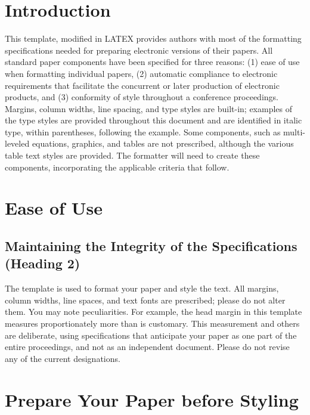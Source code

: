 \documentclass{article} %
\begin{document}
\begin{multicols}{2}



\section{ Introduction}


This template, modified in LATEX provides authors with most of the formatting specifications needed for preparing electronic versions of their papers. All standard paper components have been specified for three reasons: (1) ease of use when formatting individual papers, (2) automatic compliance to electronic requirements that facilitate the concurrent or later production of electronic products, and (3) conformity of style throughout a conference proceedings. Margins, column widths, line spacing, and type styles are built-in; examples of the type styles are provided throughout this document and are identified in italic type, within parentheses, following the example. Some components, such as multi-leveled equations, graphics, and tables are not prescribed, although the various table text styles are provided. The formatter will need to create these components, incorporating the applicable criteria that follow.


\section{ Ease of Use}


\subsection{Maintaining the Integrity of the Specifications (Heading 2)}



The template is used to format your paper and style the text. All margins, column widths, line spaces, and text fonts are prescribed; please do not alter them. You may note peculiarities. For example, the head margin in this template measures proportionately more than is customary. This measurement and others are deliberate, using specifications that anticipate your paper as one part of the entire proceedings, and not as an independent document. Please do not revise any of the current designations.


\section{Prepare Your Paper before Styling}


\end{multicols}
\end{document}
